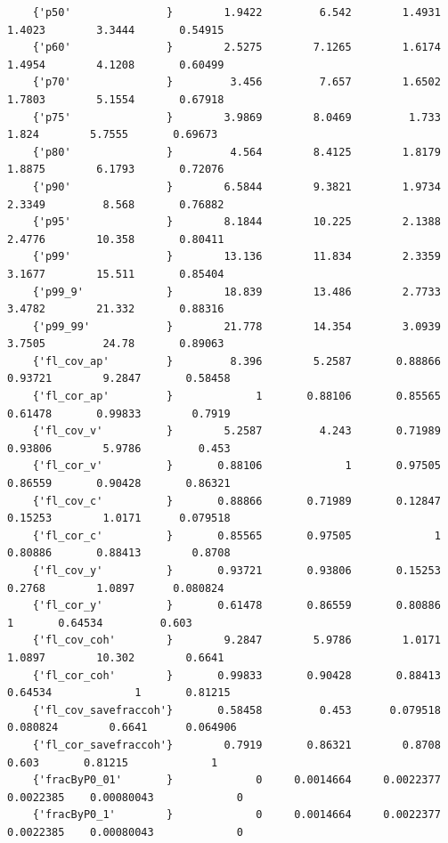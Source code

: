 \documentclass[
]{book}
\begin{document}
\begin{verbatim}
    {'p50'               }        1.9422         6.542        1.4931        1.4023        3.3444       0.54915 
    {'p60'               }        2.5275        7.1265        1.6174        1.4954        4.1208       0.60499 
    {'p70'               }         3.456         7.657        1.6502        1.7803        5.1554       0.67918 
    {'p75'               }        3.9869        8.0469         1.733         1.824        5.7555       0.69673 
    {'p80'               }         4.564        8.4125        1.8179        1.8875        6.1793       0.72076 
    {'p90'               }        6.5844        9.3821        1.9734        2.3349         8.568       0.76882 
    {'p95'               }        8.1844        10.225        2.1388        2.4776        10.358       0.80411 
    {'p99'               }        13.136        11.834        2.3359        3.1677        15.511       0.85404 
    {'p99_9'             }        18.839        13.486        2.7733        3.4782        21.332       0.88316 
    {'p99_99'            }        21.778        14.354        3.0939        3.7505         24.78       0.89063 
    {'fl_cov_ap'         }         8.396        5.2587       0.88866       0.93721        9.2847       0.58458 
    {'fl_cor_ap'         }             1       0.88106       0.85565       0.61478       0.99833        0.7919 
    {'fl_cov_v'          }        5.2587         4.243       0.71989       0.93806        5.9786         0.453 
    {'fl_cor_v'          }       0.88106             1       0.97505       0.86559       0.90428       0.86321 
    {'fl_cov_c'          }       0.88866       0.71989       0.12847       0.15253        1.0171      0.079518 
    {'fl_cor_c'          }       0.85565       0.97505             1       0.80886       0.88413        0.8708 
    {'fl_cov_y'          }       0.93721       0.93806       0.15253        0.2768        1.0897      0.080824 
    {'fl_cor_y'          }       0.61478       0.86559       0.80886             1       0.64534         0.603 
    {'fl_cov_coh'        }        9.2847        5.9786        1.0171        1.0897        10.302        0.6641 
    {'fl_cor_coh'        }       0.99833       0.90428       0.88413       0.64534             1       0.81215 
    {'fl_cov_savefraccoh'}       0.58458         0.453      0.079518      0.080824        0.6641      0.064906 
    {'fl_cor_savefraccoh'}        0.7919       0.86321        0.8708         0.603       0.81215             1 
    {'fracByP0_01'       }             0     0.0014664     0.0022377     0.0022385    0.00080043             0 
    {'fracByP0_1'        }             0     0.0014664     0.0022377     0.0022385    0.00080043             0 

\end{verbatim}
\end{document}
